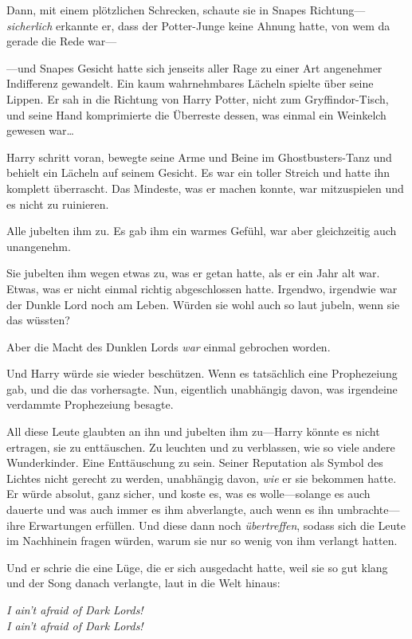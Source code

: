 Dann, mit einem plötzlichen Schrecken, schaute sie in Snapes Richtung—\emph{sicherlich} erkannte er, dass der Potter-Junge keine Ahnung hatte, von wem da gerade die Rede war—

—und Snapes Gesicht hatte sich jenseits aller Rage zu einer Art angenehmer Indifferenz gewandelt. Ein kaum wahrnehmbares Lächeln spielte über seine Lippen. Er sah in die Richtung von Harry Potter, nicht zum Gryffindor-Tisch, und seine Hand komprimierte die Überreste dessen, was einmal ein Weinkelch gewesen war…

Harry schritt voran, bewegte seine Arme und Beine im Ghostbusters-Tanz und behielt ein Lächeln auf seinem Gesicht. Es war ein toller Streich und hatte ihn komplett überrascht. Das Mindeste, was er machen konnte, war mitzuspielen und es nicht zu ruinieren.

Alle jubelten ihm zu. Es gab ihm ein warmes Gefühl, war aber gleichzeitig auch unangenehm.

Sie jubelten ihm wegen etwas zu, was er getan hatte, als er ein Jahr alt war. Etwas, was er nicht einmal richtig abgeschlossen hatte. Irgendwo, irgendwie war der Dunkle Lord noch am Leben. Würden sie wohl auch so laut jubeln, wenn sie das wüssten?

Aber die Macht des Dunklen Lords \emph{war} einmal gebrochen worden.

Und Harry würde sie wieder beschützen. Wenn es tatsächlich eine Prophezeiung gab, und die das vorhersagte. Nun, eigentlich unabhängig davon, was irgendeine verdammte Prophezeiung besagte.

All diese Leute glaubten an ihn und jubelten ihm zu—Harry könnte es nicht ertragen, sie zu enttäuschen. Zu leuchten und zu verblassen, wie so viele andere Wunderkinder. Eine Enttäuschung zu sein. Seiner Reputation als Symbol des Lichtes nicht gerecht zu werden, unabhängig davon, \emph{wie} er sie bekommen hatte. Er würde absolut, ganz sicher, und koste es, was es wolle—solange es auch dauerte und was auch immer es ihm abverlangte, auch wenn es ihn umbrachte—ihre Erwartungen erfüllen. Und diese dann noch \emph{übertreffen}, sodass sich die Leute im Nachhinein fragen würden, warum sie nur so wenig von ihm verlangt hatten.

Und er schrie die eine Lüge, die er sich ausgedacht hatte, weil sie so gut klang und der Song danach verlangte, laut in die Welt hinaus:

\begin{center}
\emph{I ain’t afraid of Dark Lords!\\
I ain’t afraid of Dark Lords!}
\end{center}

